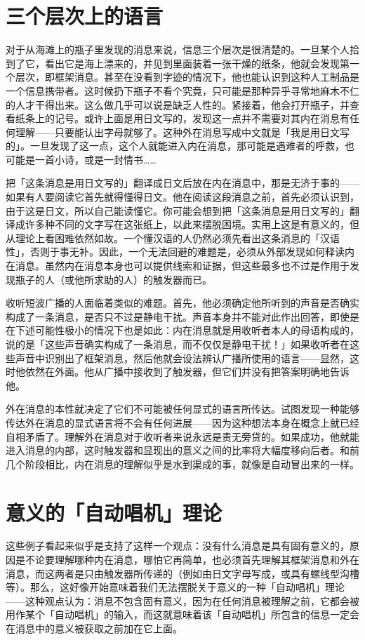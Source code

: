 \documentclass[
  12pt,
  twoside,
  openright,
  oldfontcommands,
]{memoir}
\begin{document}
\section{三个层次上的语言}

对于从海滩上的瓶子里发现的消息来说，信息三个层次是很清楚的。一旦某个人拾到了它，看出它是海上漂来的，并见到里面装着一张干燥的纸条，他就会发现第一个层次，即框架消息。甚至在没看到字迹的情况下，他也能认识到这种人工制品是一个信息携带者。这时候扔下瓶子不看个究竟，只可能是那种异乎寻常地麻木不仁的人才干得出来。这么做几乎可以说是缺乏人性的。紧接着，他会打开瓶子，并查看纸条上的记号。或许上面是用日文写的，发现这一点并不需要对其内在消息有任何理解------只要能认出字母就够了。这种外在消息写成中文就是「我是用日文写的」。一旦发现了这一点，这个人就能进入内在消息，那可能是遇难者的呼救，也可能是一首小诗，或是一封情书\ldots\ldots{}

把「这条消息是用日文写的」翻译成日文后放在内在消息中，那是无济于事的------如果有人要阅读它首先就得懂得日文。他在阅读这段消息之前，首先必须认识到，由于这是日文，所以自己能读懂它。你可能会想到把「这条消息是用日文写的」翻译成许多种不同的文字写在这张纸上，以此来摆脱困境。实用上这是有意义的，但从理论上看困难依然如故。一个懂汉语的人仍然必须先看出这条消息的「汉语性」，否则于事无补。因此，一个无法回避的难题是，必须从外部发现如何释读内在消息。虽然内在消息本身也可以提供线索和证据，但这些最多也不过是作用于发现瓶子的人（或他所求助的人）的触发器而已。

收听短波广播的人面临着类似的难题。首先，他必须确定他所听到的声音是否确实构成了一条消息，是否只不过是静电干扰。声音本身并不能对此作出回答，即使是在下述可能性极小的情况下也是如此：内在消息就是用收听者本人的母语构成的，说的是「这些声音确实构成了一条消息，而不仅仅是静电干扰！」如果收听者在这些声音中识别出了框架消息，然后他就会设法辨认广播所使用的语言------显然，这时他依然在外面。他从广播中接收到了触发器，但它们并没有把答案明确地告诉他。

外在消息的本性就决定了它们不可能被任何显式的语言所传达。试图发现一种能够传达外在消息的显式语言将不会有任何进展------因为这种想法本身在概念上就已经自相矛盾了。理解外在消息对于收听者来说永远是责无旁贷的。如果成功，他就能进入消息的内部，这时触发器和显现出的意义之间的比率将大幅度移向后者。和前几个阶段相比，内在消息的理解似乎是水到渠成的事，就像是自动冒出来的一样。

\section{意义的「自动唱机」理论}

这些例子看起来似乎是支持了这样一个观点：没有什么消息是具有固有意义的，原因是不论要理解哪种内在消息，哪怕它再简单，也必须首先理解其框架消息和外在消息，而这两者是只由触发器所传递的（例如由日文字母写成，或具有螺线型沟槽等）。那么，这好像开始意味着我们无法摆脱关于意义的一种「自动唱机」理论------这种观点认为：消息不包含固有意义，因为在任何消息被理解之前，它都会被用作某个「自动唱机」的输入，而这就意味着该「自动唱机」所包含的信息一定会在消息中的意义被获取之前加在它上面。
\end{document}
